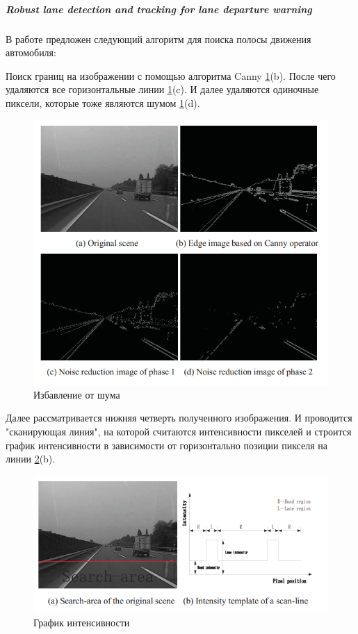 \subparagraph{Robust lane detection and tracking for lane departure warning}
В работе \cite{b:lane_detection} предложен следующий алгоритм для поиска полосы движения автомобиля:

Поиск границ на изображении с помощью алгоритма Canny \ref{fig:screenshot00232}(b).
После чего удаляются все горизонтальные линии \ref{fig:screenshot00232}(c). И далее удаляются одиночные пиксели, которые тоже являются шумом \ref{fig:screenshot00232}(d).
\begin{figure}[!h]
	\centering
	\includegraphics[width=0.5\linewidth]{pictures/screenshot00232}
	\caption{Избавление от шума}
	\label{fig:screenshot00232}
\end{figure}
\newpage

Далее рассматривается нижняя четверть полученного изображения. И проводится "сканирующая линия", на которой считаются интенсивности пикселей и строится график интенсивности в зависимости от горизонтально позиции пикселя на линии \ref{fig:screenshot00233}(b).
\begin{figure}[h!]
	\centering
	\includegraphics[width=1\linewidth]{pictures/screenshot00233}
	\caption{График интенсивности}
	\label{fig:screenshot00233}
\end{figure}

